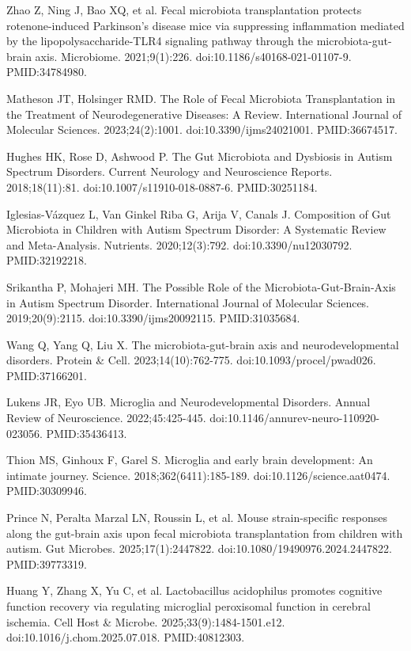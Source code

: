 \documentclass[12pt,oneside]{book}
\newcommand{\reff}[2]{\par\hangindent=7mm\hangafter=1\noindent[#1]\hspace{2mm}#2\par}
\begin{document}
\reff{70}{Zhao Z, Ning J, Bao XQ, et al. Fecal microbiota transplantation protects rotenone-induced Parkinson's disease mice via suppressing inflammation mediated by the lipopolysaccharide-TLR4 signaling pathway through the microbiota-gut-brain axis. Microbiome. 2021;9(1):226. doi:10.1186/s40168-021-01107-9. PMID:34784980.}

\reff{71}{Matheson JT, Holsinger RMD. The Role of Fecal Microbiota Transplantation in the Treatment of Neurodegenerative Diseases: A Review. International Journal of Molecular Sciences. 2023;24(2):1001. doi:10.3390/ijms24021001. PMID:36674517.}

\reff{72}{Hughes HK, Rose D, Ashwood P. The Gut Microbiota and Dysbiosis in Autism Spectrum Disorders. Current Neurology and Neuroscience Reports. 2018;18(11):81. doi:10.1007/s11910-018-0887-6. PMID:30251184.}

\reff{73}{Iglesias-Vázquez L, Van Ginkel Riba G, Arija V, Canals J. Composition of Gut Microbiota in Children with Autism Spectrum Disorder: A Systematic Review and Meta-Analysis. Nutrients. 2020;12(3):792. doi:10.3390/nu12030792. PMID:32192218.}

\reff{74}{Srikantha P, Mohajeri MH. The Possible Role of the Microbiota-Gut-Brain-Axis in Autism Spectrum Disorder. International Journal of Molecular Sciences. 2019;20(9):2115. doi:10.3390/ijms20092115. PMID:31035684.}

\reff{75}{Wang Q, Yang Q, Liu X. The microbiota-gut-brain axis and neurodevelopmental disorders. Protein \& Cell. 2023;14(10):762-775. doi:10.1093/procel/pwad026. PMID:37166201.}

\reff{76}{Lukens JR, Eyo UB. Microglia and Neurodevelopmental Disorders. Annual Review of Neuroscience. 2022;45:425-445. doi:10.1146/annurev-neuro-110920-023056. PMID:35436413.}

\reff{77}{Thion MS, Ginhoux F, Garel S. Microglia and early brain development: An intimate journey. Science. 2018;362(6411):185-189. doi:10.1126/science.aat0474. PMID:30309946.}

\reff{78}{Prince N, Peralta Marzal LN, Roussin L, et al. Mouse strain-specific responses along the gut-brain axis upon fecal microbiota transplantation from children with autism. Gut Microbes. 2025;17(1):2447822. doi:10.1080/19490976.2024.2447822. PMID:39773319.}

\reff{79}{Huang Y, Zhang X, Yu C, et al. Lactobacillus acidophilus promotes cognitive function recovery via regulating microglial peroxisomal function in cerebral ischemia. Cell Host \& Microbe. 2025;33(9):1484-1501.e12. doi:10.1016/j.chom.2025.07.018. PMID:40812303.}
\end{document}
